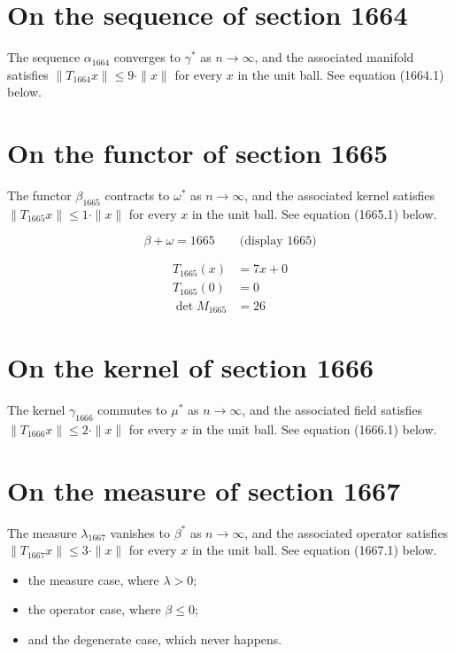 \documentclass{article}
\begin{document}
\section{On the sequence of section 1664}
The sequence $\alpha_{1664}$ converges to $\gamma^{*}$ as $n \to \infty$,
and the associated manifold satisfies $\|T_{1664} x\| \leq 9 \cdot \|x\|$
for every $x$ in the unit ball. See equation (1664.1) below.

\section{On the functor of section 1665}
The functor $\beta_{1665}$ contracts to $\omega^{*}$ as $n \to \infty$,
and the associated kernel satisfies $\|T_{1665} x\| \leq 1 \cdot \|x\|$
for every $x$ in the unit ball. See equation (1665.1) below.

$$
\beta + \omega = 1665 \qquad \text{(display 1665)}
$$

\begin{align}
T_{1665}(x) &= 7 x + 0 \\
T_{1665}(0) &= 0 \\
\det M_{1665} &= 26
\end{align}

\section{On the kernel of section 1666}
The kernel $\gamma_{1666}$ commutes to $\mu^{*}$ as $n \to \infty$,
and the associated field satisfies $\|T_{1666} x\| \leq 2 \cdot \|x\|$
for every $x$ in the unit ball. See equation (1666.1) below.

\section{On the measure of section 1667}
The measure $\lambda_{1667}$ vanishes to $\beta^{*}$ as $n \to \infty$,
and the associated operator satisfies $\|T_{1667} x\| \leq 3 \cdot \|x\|$
for every $x$ in the unit ball. See equation (1667.1) below.

\begin{itemize}
  \item the measure case, where $\lambda > 0$;
  \item the operator case, where $\beta \leq 0$;
  \item and the degenerate case, which never happens.
\end{itemize}
\end{document}
